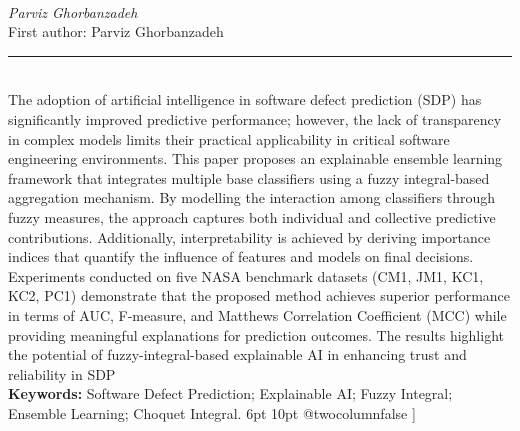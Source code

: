 \documentclass[10pt,twoside]{article}
\begin{document}
\noindent\begin{minipage}[t][\textheight]{\textwidth}
\\[0.35em]
{\itshape Parviz Ghorbanzadeh}\\[0.2em]
{\footnotesize First author: Parviz Ghorbanzadeh}\\[0.45em]
\noindent\rule{\textwidth}{0.3pt}\\[0.4em]
{\footnotesize The adoption of artificial intelligence in software defect prediction (SDP) has significantly improved predictive performance; however, the lack of transparency in complex models limits their practical applicability in critical software engineering environments. This paper proposes an explainable ensemble learning framework that integrates multiple base classifiers using a fuzzy integral-based aggregation mechanism. By modelling the interaction among classifiers through fuzzy measures, the approach captures both individual and collective predictive contributions. Additionally, interpretability is achieved by deriving importance indices that quantify the influence of features and models on final decisions. Experiments conducted on five NASA benchmark datasets (CM1, JM1, KC1, KC2, PC1) demonstrate that the proposed method achieves superior performance in terms of AUC, F-measure, and Matthews Correlation Coefficient (MCC) while providing meaningful explanations for prediction outcomes. The results highlight the potential of fuzzy-integral-based explainable AI in enhancing trust and reliability in SDP}\\[0.4em]
{\footnotesize\bfseries Keywords:} {\footnotesize Software Defect Prediction; Explainable AI; Fuzzy Integral; Ensemble Learning; Choquet Integral. 6pt 10pt @twocolumnfalse ]}\\[0.15em]
\vfill
\end{minipage}
\newpage
\end{document}
